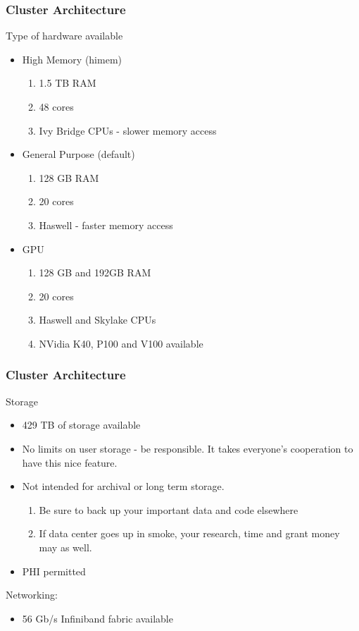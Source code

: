\documentclass{beamer}
\begin{document}
\begin{frame}
\frametitle{Cluster Architecture}
Type of hardware available
\begin{itemize}
    \item High Memory (himem)
    \begin{enumerate}
        \item 1.5 TB RAM
        \item 48 cores 
        \item Ivy Bridge CPUs - slower memory access
    \end{enumerate}
    \pause 
    \bigskip
    \pause
    \item General Purpose (default)
    \begin{enumerate}
        \item 128 GB RAM
        \item 20 cores 
        \item Haswell - faster memory access
    \end{enumerate}
    \bigskip
    \pause
    \item GPU 
    \begin{enumerate}
        \item 128 GB and 192GB RAM 
        \item 20 cores 
        \item Haswell and Skylake CPUs
        \item NVidia K40, P100 and V100 available
    \end{enumerate}
\end{itemize}
\end{frame}


\begin{frame}
\frametitle{Cluster Architecture}
Storage 
\begin{itemize}
    \item 429 TB of storage available
    \pause
    \item No limits on user storage - be responsible.
          It takes everyone's cooperation to have this nice feature.
    \pause
    \item Not intended for archival or long term storage.
        \begin{enumerate}
              \item Be sure to back up your important data and code elsewhere
              \item If data center goes up in smoke, your research, time and grant money may as well.
        \end{enumerate}
    \pause
    \item PHI permitted
\end{itemize}
\pause
Networking:
\begin{itemize}
    \item 56 Gb/s Infiniband fabric available
\end{itemize}
\end{frame}
\end{document}
